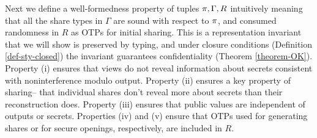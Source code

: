 Next we define a well-formedness property of tuples $\pi,\Gamma,R$
intuitively meaning that all the share types in $\Gamma$ are sound with respect
to $\pi$, and consumed randomness in $R$ as OTPs for initial sharing.
This is a representation invariant that we will show is preserved by
typing, and under closure conditions (Definition \ref{def-sty-closed})
the invariant guarantees confidentiality (Theorem \ref{theorem-OK}).
Property (i) ensures that views do not reveal information about secrets
consistent with noninterference modulo output.
Property (ii) ensures a key property of sharing-- that individual shares
don't reveal more about secrets than their reconstruction does. Property
(iii) ensures that public values are independent of outputs or secrets. Properties
(iv) and (v) ensure that OTPs used for generating shares or for
secure openings, respectively, are included in $R$.
